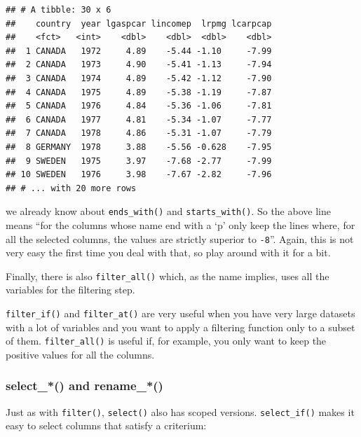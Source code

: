 \documentclass[]{gitbook}
\newenvironment{Shaded}{\begin{snugshade}}{\end{snugshade}}
\newcommand{\KeywordTok}[1]{\textcolor[rgb]{0.13,0.29,0.53}{\textbf{#1}}}
\newcommand{\NormalTok}[1]{#1}
\newcommand{\OperatorTok}[1]{\textcolor[rgb]{0.81,0.36,0.00}{\textbf{#1}}}
\newcommand{\StringTok}[1]{\textcolor[rgb]{0.31,0.60,0.02}{#1}}
\theoremstyle{definition}
\theoremstyle{definition}
\theoremstyle{definition}
\theoremstyle{remark}
\begin{document}
\begin{verbatim}
## # A tibble: 30 x 6
##    country  year lgaspcar lincomep  lrpmg lcarpcap
##    <fct>   <int>    <dbl>    <dbl>  <dbl>    <dbl>
##  1 CANADA   1972     4.89    -5.44 -1.10     -7.99
##  2 CANADA   1973     4.90    -5.41 -1.13     -7.94
##  3 CANADA   1974     4.89    -5.42 -1.12     -7.90
##  4 CANADA   1975     4.89    -5.38 -1.19     -7.87
##  5 CANADA   1976     4.84    -5.36 -1.06     -7.81
##  6 CANADA   1977     4.81    -5.34 -1.07     -7.77
##  7 CANADA   1978     4.86    -5.31 -1.07     -7.79
##  8 GERMANY  1978     3.88    -5.56 -0.628    -7.95
##  9 SWEDEN   1975     3.97    -7.68 -2.77     -7.99
## 10 SWEDEN   1976     3.98    -7.67 -2.82     -7.96
## # ... with 20 more rows
\end{verbatim}

we already know about \texttt{ends\_with()} and \texttt{starts\_with()}.
So the above line means ``for the columns whose name end with a `p' only
keep the lines where, for all the selected columns, the values are
strictly superior to \texttt{-8}''. Again, this is not very easy the
first time you deal with that, so play around with it for a bit.

Finally, there is also \texttt{filter\_all()} which, as the name
implies, uses all the variables for the filtering step.

\texttt{filter\_if()} and \texttt{filter\_at()} are very useful when you
have very large datasets with a lot of variables and you want to apply a
filtering function only to a subset of them. \texttt{filter\_all()} is
useful if, for example, you only want to keep the positive values for
all the columns.

\hypertarget{select_-and-rename_}{%
\subsubsection{select\_*() and rename\_*()}\label{select_-and-rename_}}

Just as with \texttt{filter()}, \texttt{select()} also has scoped
versions. \texttt{select\_if()} makes it easy to select columns that
satisfy a criterium:

\begin{Shaded}
\end{Shaded}
\end{document}
